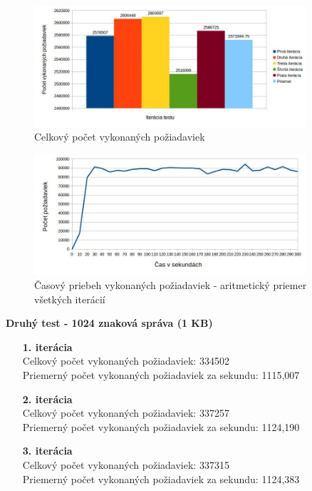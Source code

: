 \documentclass[12pt,oneside,final]{fithesis-utf8}
\begin{document}
\begin{itemize}
\begin{itemize}
\end{itemize}

\begin{figure}[H]
  \centering
      \includegraphics[width=0.9\textwidth]{gatling3_1.jpg}
  \caption{Celkový počet vykonaných požiadaviek}
\end{figure}

\begin{figure}[H]
  \centering
      \includegraphics[width=0.9\textwidth]{gatling3_1_distr.jpg}
  \caption{Časový priebeh vykonaných požiadaviek - aritmetický priemer všetkých iterácií}
\end{figure}

\textbf{Druhý test - 1024 znaková správa (1 KB)}
\begin{itemize}

\item[\textbf{1. iterácia}]\ \\
Celkový počet vykonaných požiadaviek: 334502\\
Priemerný počet vykonaných požiadaviek za sekundu: 1115,007

\item[\textbf{2. iterácia}]\ \\
Celkový počet vykonaných požiadaviek: 337257\\
Priemerný počet vykonaných požiadaviek za sekundu: 1124,190

\item[\textbf{3. iterácia}]\ \\
Celkový počet vykonaných požiadaviek: 337315\\
Priemerný počet vykonaných požiadaviek za sekundu: 1124,383


\end{itemize}
\end{itemize}
\end{document}
